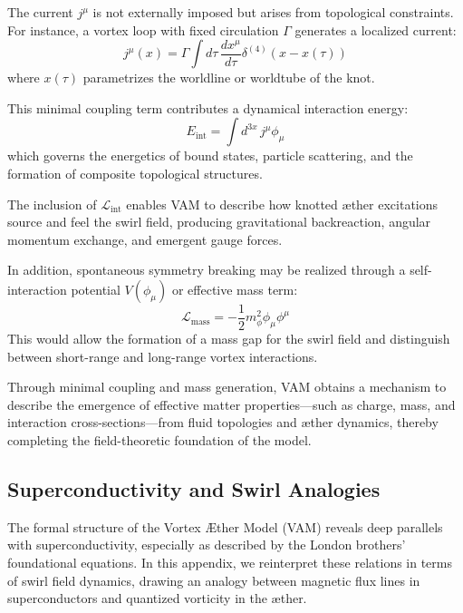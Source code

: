         The current $j^\mu$ is not externally imposed but arises from topological constraints. For instance, a vortex loop with fixed circulation $\Gamma$ generates a localized current:
        \begin{equation}
            j^\mu(x) = \Gamma \int d\tau \, \frac{dx^\mu}{d\tau} \delta^{(4)}(x - x(\tau))
        \end{equation}
        where $x(\tau)$ parametrizes the worldline or worldtube of the knot.

        This minimal coupling term contributes a dynamical interaction energy:
        \begin{equation}
            E_{\text{int}} = \int d^{3x} \, j^\mu \phi_\mu
        \end{equation}
        which governs the energetics of bound states, particle scattering, and the formation of composite topological structures.

        The inclusion of $\mathcal{L}_{\text{int}}$ enables VAM to describe how knotted æther excitations source and feel the swirl field, producing gravitational backreaction, angular momentum exchange, and emergent gauge forces.

        In addition, spontaneous symmetry breaking may be realized through a self-interaction potential $V(\phi_\mu)$ or effective mass term:
        \begin{equation}
            \mathcal{L}_{\text{mass}} = -\frac{1}{2} m_\phi^2 \phi_\mu \phi^\mu
        \end{equation}
        This would allow the formation of a mass gap for the swirl field and distinguish between short-range and long-range vortex interactions.

        Through minimal coupling and mass generation, VAM obtains a mechanism to describe the emergence of effective matter properties---such as charge, mass, and interaction cross-sections---from fluid topologies and æther dynamics, thereby completing the field-theoretic foundation of the model.

        \subsection{Superconductivity and Swirl Analogies}
        The formal structure of the Vortex Æther Model (VAM) reveals deep parallels with superconductivity, especially as described by the London brothers' foundational equations. In this appendix, we reinterpret these relations in terms of swirl field dynamics, drawing an analogy between magnetic flux lines in superconductors and quantized vorticity in the æther.

